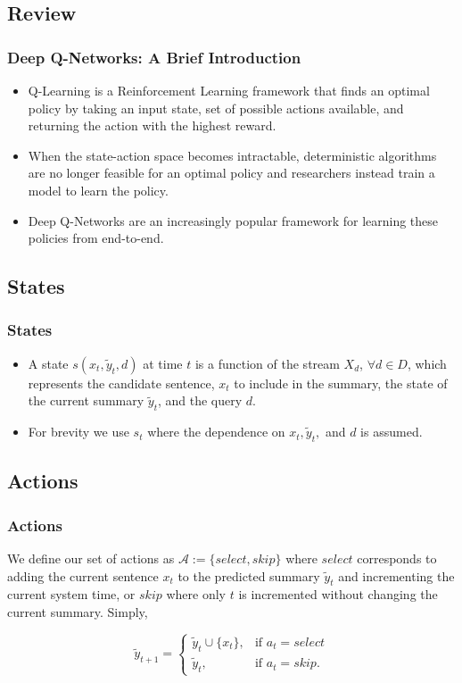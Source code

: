 \documentclass[]{beamer}
\begin{document}
	\subsection{Review}  
	\begin{frame}
			\frametitle{Deep Q-Networks: A Brief Introduction}
		\begin{itemize}
		\item <1 -> Q-Learning is a Reinforcement Learning framework that finds an optimal policy by taking an input state, set of possible actions available,  and returning the action with the highest reward.
		\item <1 -> When the state-action space becomes intractable, deterministic algorithms are no longer feasible for an optimal policy and researchers instead train a model to learn the policy. 
		\item <1 -> Deep Q-Networks \cite{MnihKSGAWR13} are an increasingly popular framework for learning these policies from end-to-end.
		\end{itemize}
	\end{frame}
	
	\subsection{States}  
	\begin{frame}
		\frametitle{States}
		\begin{itemize}
	\item<1 ->  A state $s(x_{t},\tilde{y}_{t}, d)$ at time $t$ is a function of the stream $X_d$, $\forall d \in D$, which represents the candidate sentence, $x_t$ to include in the summary, the state of the current summary $\tilde{y}_t$, and the query $d$. 	
	\item<1 -> For brevity we use $s_t$ where the dependence on $x_{t},\tilde{y}_{t},$ and $d$ is assumed.
		\end{itemize}
	\end{frame}

	\subsection{Actions}
	\begin{frame}
			\frametitle{Actions}
			We define our set of actions as $\mathcal{A} := \{select, skip\}$ where $select$ corresponds to adding the current sentence $x_t$ to the predicted summary $\tilde{y}_t$ and incrementing the current system time, or $skip$ where only $t$ is incremented without changing the current summary. Simply, 
			
	\begin{equation}
		\tilde{y}_{t + 1} =
		\begin{cases}
			\tilde{y}_{t} \cup \{ x_t \},	& \text{if } a_t = select  \\
			\tilde{y}_{t}, 			& \text{if } a_t = skip.
		\end{cases}
	\end{equation}

	\end{frame}
\end{document}
